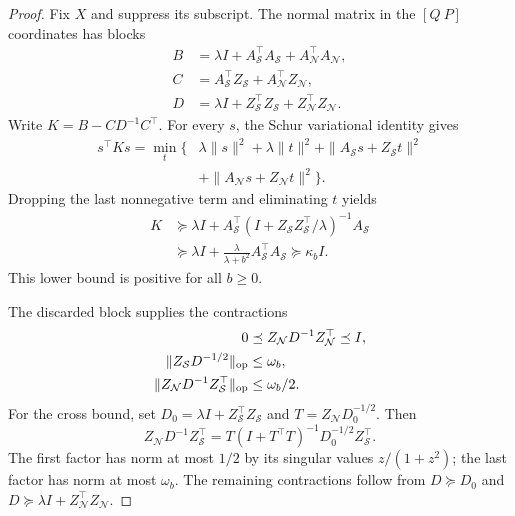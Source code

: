 \begin{proof}
Fix $X$ and suppress its subscript. The normal matrix in the $[Q\ P]$ coordinates has blocks
\begin{align*}
 B&=\lambda I+A_{\mathcal S}^\top A_{\mathcal S}
                  +A_{\mathcal N}^\top A_{\mathcal N},\\
 C&=A_{\mathcal S}^\top Z_{\mathcal S}
                  +A_{\mathcal N}^\top Z_{\mathcal N},\\
 D&=\lambda I+Z_{\mathcal S}^\top Z_{\mathcal S}
                  +Z_{\mathcal N}^\top Z_{\mathcal N}.
\end{align*}
Write $K=B-CD^{-1}C^\top$. For every $s$, the Schur variational identity gives
\begin{align*}
 s^\top Ks=\min_t\bigl\{&\lambda\|s\|^2+\lambda\|t\|^2
 +\|A_{\mathcal S}s+Z_{\mathcal S}t\|^2\\
 &+\|A_{\mathcal N}s+Z_{\mathcal N}t\|^2\bigr\}.
\end{align*}
Dropping the last nonnegative term and eliminating $t$ yields
\begin{align*}
 K&\succeq\lambda I+
 A_{\mathcal S}^\top
 (I+Z_{\mathcal S}Z_{\mathcal S}^\top/\lambda)^{-1}A_{\mathcal S}\\
 &\succeq\lambda I+\frac{\lambda}{\lambda+b^2}
 A_{\mathcal S}^\top A_{\mathcal S}
 \succeq\kappa_b I.
\end{align*}
This lower bound is positive for all $b\ge0$.

The discarded block supplies the contractions
\begin{align}
 0&\preceq Z_{\mathcal N}D^{-1}Z_{\mathcal N}^\top\preceq I,
 \nonumber\\
 \|Z_{\mathcal S}D^{-1/2}\|_{\mathrm{op}}&\le\omega_b,\nonumber\\
 \|Z_{\mathcal N}D^{-1}Z_{\mathcal S}^\top\|_{\mathrm{op}}&\le\omega_b/2.
 \label{eq:leakage-block-v79}
\end{align}
For the cross bound, set $D_0=\lambda I+Z_{\mathcal S}^\top Z_{\mathcal S}$ and $T=Z_{\mathcal N}D_0^{-1/2}$. Then
\[
 Z_{\mathcal N}D^{-1}Z_{\mathcal S}^\top
 =T(I+T^\top T)^{-1}D_0^{-1/2}Z_{\mathcal S}^\top.
\]
The first factor has norm at most $1/2$ by its singular values $z/(1+z^2)$; the last factor has norm at most $\omega_b$. The remaining contractions follow from $D\succeq D_0$ and $D\succeq\lambda I+Z_{\mathcal N}^\top Z_{\mathcal N}$.


\end{proof}
